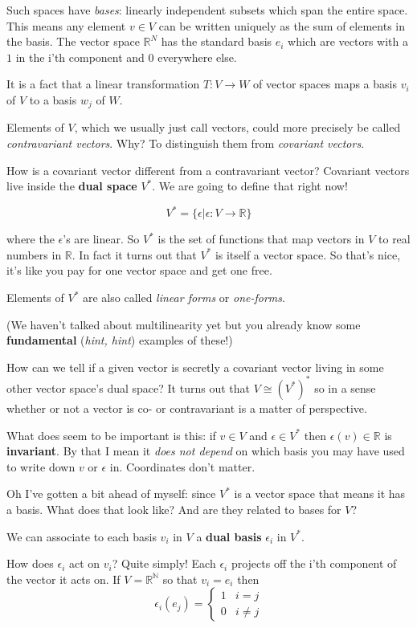 \documentclass{article}
\begin{document}
Such spaces have \textsl{bases}: linearly independent subsets which span the
entire space. This means any element $v \in V$ can be written uniquely as the
sum of elements in the basis. The vector space $\mathbb{R}^{N}$ has the standard basis $e_{i}$
which are vectors with a $1$ in the i'th component and $0$ everywhere else.

It is a fact that a linear transformation $T : V \to W$ of vector spaces maps a
basis $v_{i}$ of $V$ to a basis $w_{j}$ of $W$.

Elements of $V$, which we usually just call vectors, could more precisely be
called \textsl{contravariant vectors}. Why? To distinguish them from
\textsl{covariant vectors}.

How is a covariant vector different from a contravariant vector? Covariant
vectors live inside the \textbf{dual space} $V^{*}$. We are going to define that
right now!

\[ V^{*} = \{ \epsilon | \epsilon : V \to \mathbb{R} \} \]

where the $\epsilon$'s are linear. So $V^{*}$ is the set of functions that map
vectors in $V$ to real numbers in $\mathbb{R}$. In fact it turns out that
$V^{*}$ is itself a vector space. So that's nice, it's like you pay for one
vector space and get one free.

Elements of $V^{*}$ are also called \textsl{linear forms} or \textsl{one-forms}.

(We haven't talked about multilinearity yet but you already know some
\textbf{fundamental} (\textsl{hint, hint}) examples of these!)

How can we tell if a given vector is secretly a covariant vector living in some
other vector space's dual space? It turns out that $V \cong (V^{*})^{*}$ so in a
sense whether or not a vector is co- or contravariant is a matter of
perspective.

What does seem to be important is this: if $v \in V$ and $\epsilon \in V^{*}$
then $\epsilon(v) \in \mathbb{R}$ is \textbf{invariant}. By that I mean it
\textsl{does not depend} on which basis you may have used to write down $v$ or
$\epsilon$ in. Coordinates don't matter.

Oh I've gotten a bit ahead of myself: since $V^{*}$ is a vector space that means
it has a basis. What does that look like? And are they related to bases for $V$?

We can associate to each basis $v_{i}$ in $V$ a \textbf{dual basis}
$\epsilon_{i}$ in $V^{*}$.

How does $\epsilon_{i}$ act on $v_{i}$? Quite simply! Each $\epsilon_{i}$
projects off the i'th component of the vector it acts on. If $V =
\mathbb{R^{N}}$ so that $v_{i} = e_{i}$ then
\begin{equation*}
  \epsilon_{i}(e_{j}) = \begin{cases}
    1 & i = j\\
    0 & i \neq j
  \end{cases}
\end{equation*}
\end{document}
